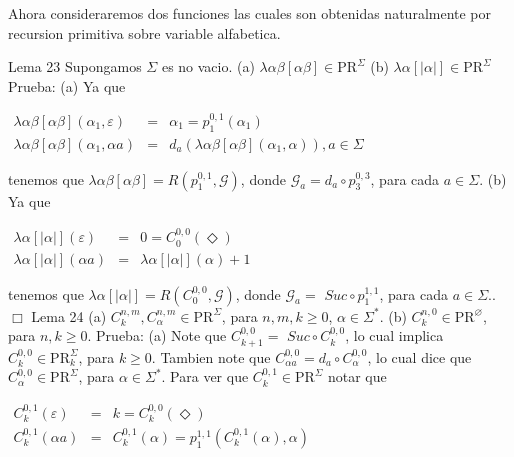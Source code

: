 Ahora consideraremos dos funciones las cuales son obtenidas naturalmente por recursion primitiva sobre variable alfabetica.

Lema 23 Supongamos \(\Sigma \) es no vacio.
(a) \(\lambda \alpha \beta \left[ \alpha \beta \right] \in \mathrm{PR} ^{\Sigma }\)
(b) \(\lambda \alpha \left[ \left\vert \alpha \right\vert \right] \in \mathrm{PR}^{\Sigma }\)
Prueba: (a) Ya que

\(\displaystyle \begin{array}{rcl} \lambda \alpha \beta \left[ \alpha \beta \right] (\alpha _{1},\varepsilon ) & =& \alpha _{1}=p_{1}^{0,1}(\alpha _{1}) \\ \lambda \alpha \beta \left[ \alpha \beta \right] (\alpha _{1},\alpha a) & =& d_{a}(\lambda \alpha \beta \left[ \alpha \beta \right] (\alpha _{1},\alpha )),a\in \Sigma \end{array} \)

tenemos que \(\lambda \alpha \beta \left[ \alpha \beta \right] =R\left( p_{1}^{0,1},\mathcal{G}\right) \), donde \(\mathcal{G}_{a}=d_{a}\circ p_{3}^{0,3}\), para cada \(a\in \Sigma \).
(b) Ya que

\(\displaystyle \begin{array}{rcl} \lambda \alpha \left[ \left\vert \alpha \right\vert \right] (\varepsilon ) & =& 0=C_{0}^{0,0}(\Diamond ) \\ \lambda \alpha \left[ \left\vert \alpha \right\vert \right] (\alpha a) & =& \lambda \alpha \left[ \left\vert \alpha \right\vert \right] (\alpha )+1 \end{array} \)

tenemos que \(\lambda \alpha \left[ \left\vert \alpha \right\vert \right] =R\left( C_{0}^{0,0},\mathcal{G}\right) \), donde \(\mathcal{G}_{a}=\) \( Suc\circ p_{1}^{1,1}\), para cada \(a\in \Sigma .\). \(\Box\)
Lema 24
(a) \(C_{k}^{n,m},C_{\alpha }^{n,m}\in \mathrm{PR}^{\Sigma }\), para \( n,m,k\geq 0\), \(\alpha \in \Sigma ^{\ast }\).
(b) \(C_{k}^{n,0}\in \mathrm{PR}^{\varnothing }\), para \(n,k\geq 0\).
Prueba: (a) Note que \(C_{k+1}^{0,0}=\) \(Suc\circ C_{k}^{0,0}\), lo cual implica \( C_{k}^{0,0}\in \mathrm{PR}_{k}^{\Sigma }\), para \(k\geq 0\). Tambien note que \( C_{\alpha a}^{0,0}=d_{a}\circ C_{\alpha }^{0,0}\), lo cual dice que \( C_{\alpha }^{0,0}\in \mathrm{PR}^{\Sigma }\), para \(\alpha \in \Sigma ^{\ast } \). Para ver que \(C_{k}^{0,1}\in \mathrm{PR}^{\Sigma }\) notar que

\(\displaystyle \begin{array}{rcl} C_{k}^{0,1}(\varepsilon ) & =& k=C_{k}^{0,0}(\Diamond ) \\ C_{k}^{0,1}(\alpha a) & =& C_{k}^{0,1}(\alpha )=p_{1}^{1,1}\left( C_{k}^{0,1}(\alpha ),\alpha \right) \end{array} \)

